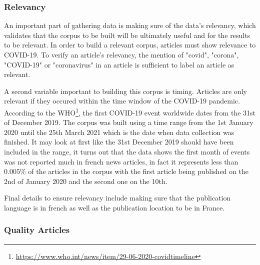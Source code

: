 \subsubsection{Relevancy}

An important part of gathering data is making sure of the data's relevancy, which validates that the corpus to be built will be ultimately useful and for the results to be relevant. In order to build a relevant corpus, articles must show relevance to COVID-19. To verify an article's relevancy, the mention of "covid", "corona", "COVID-19" or "coronavirus" in an article is sufficient to label an article as relevant.

A second variable important to building this corpus is timing. Articles are only relevant if they occured within the time window of the COVID-19 pandemic. According to the WHO\footnote{\url{https://www.who.int/news/item/29-06-2020-covidtimeline}}, the first COVID-19 event worldwide dates from the 31st of December 2019. The corpus was built using a time range from the 1st January 2020 until the 25th March 2021 which is the date when data collection was finished. It may look at first like the 31st December 2019 should have been included in the range, it turns out that the data shows the first month of events was not reported much in french news articles, in fact it represents less than $0.005\%$ of the articles in the corpus with the first article being published on the 2nd of January 2020 and the second one on the 10th.

Final details to ensure relevancy include making sure that the publication language is in french as well as the publication location to be in France.

\subsubsection{Quality Articles}

